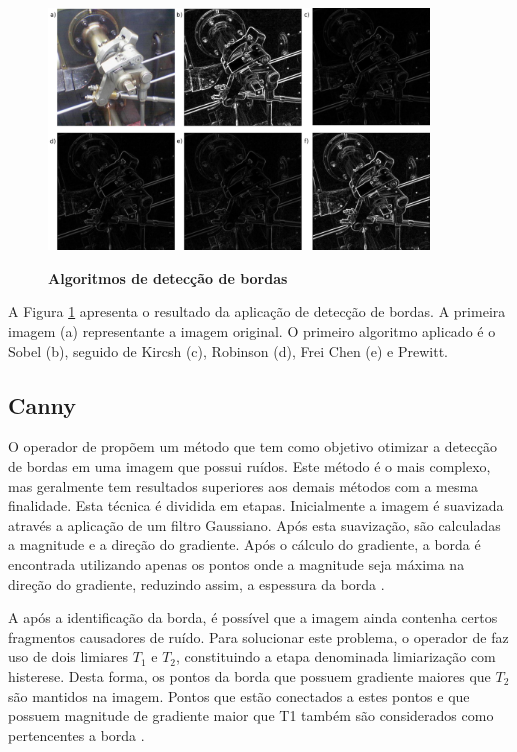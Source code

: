 \documentclass[
	12pt,				%
	oneside,			%
	a4paper,			%
	english,			%
	french,				%
	spanish,			%
	brazil,				%
	]{abntex2}
\begin{document}
\begin{figure}[ht]
\centering
\caption{\textbf{Algoritmos de detecção de bordas}}
\includegraphics[width=0.9\textwidth]{imagens/deteccao_bordas.png}
\sourceAuthor
\label{fig:deteccao_bordas}
\end{figure}

A Figura \ref{fig:deteccao_bordas} apresenta o resultado da aplicação de detecção de bordas. A primeira imagem (a) representante a imagem original. O primeiro algoritmo aplicado é o Sobel (b), seguido de Kircsh (c), Robinson (d), Frei Chen (e) e Prewitt.

\subsection{Canny}

O operador de \citet{canny:1986} propõem um método que tem como objetivo otimizar a detecção de bordas em uma imagem que possui ruídos. Este método é o mais complexo, mas geralmente tem resultados superiores aos demais métodos com a mesma finalidade. Esta técnica é dividida em etapas. Inicialmente a imagem é suavizada através a aplicação de um filtro Gaussiano. Após esta suavização, são calculadas a magnitude e a direção do gradiente. Após o cálculo do gradiente, a borda é encontrada utilizando apenas os pontos onde a magnitude seja máxima na direção do gradiente, reduzindo assim, a espessura da borda \cite{pedriniSchwartz:2008}.

A após a identificação da borda, é possível que a imagem ainda contenha certos fragmentos causadores de ruído. Para solucionar este problema, o operador de \citet{canny:1986} faz uso de dois limiares \(T_1\) e \(T_2\), constituindo a etapa denominada limiarização com histerese. Desta forma, os pontos da borda que possuem gradiente maiores que \(T_2\) são mantidos na imagem. Pontos que estão conectados a estes pontos e que possuem magnitude de gradiente maior que T1 também são considerados como pertencentes a borda \cite{pedriniSchwartz:2008}.
\end{document}
